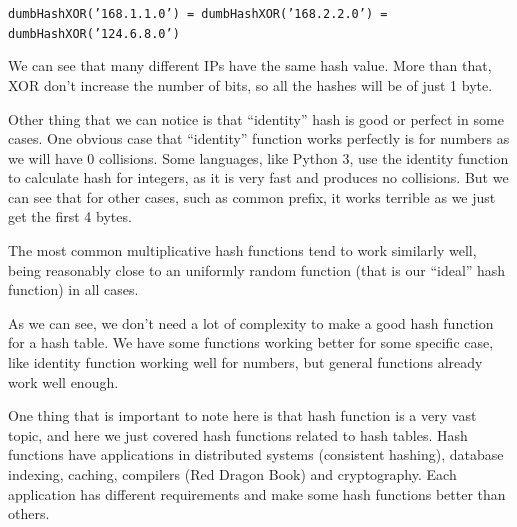 \texttt{dumbHashXOR('168.1.1.0') = dumbHashXOR('168.2.2.0') = dumbHashXOR('124.6.8.0')}

We can see that many different IPs have the same hash value. More than that, XOR don't increase the number of bits, so all the hashes will be of just 1 byte.

Other thing that we can notice is that ``identity'' hash is good or perfect in some cases. One obvious case that ``identity'' function works perfectly is for numbers as we will have 0 collisions. Some languages, like Python 3, use the identity function to calculate hash for integers, as it is very fast and produces no collisions. But we can see that for other cases, such as common prefix, it works terrible as we just get the first 4 bytes.

The most common multiplicative hash functions tend to work similarly well, being reasonably close to an uniformly random function (that is our ``ideal'' hash function) in all cases.

As we can see, we don't need a lot of complexity to make a good hash function for a hash table. We have some functions working better for some specific case, like identity function working well for numbers, but general functions already work well enough.

One thing that is important to note here is that hash function is a very vast topic, and here we just covered hash functions related to hash tables. Hash functions have applications in distributed systems (consistent hashing), database indexing, caching, compilers (Red Dragon Book) and cryptography. Each application has different requirements and make some hash functions better than others.